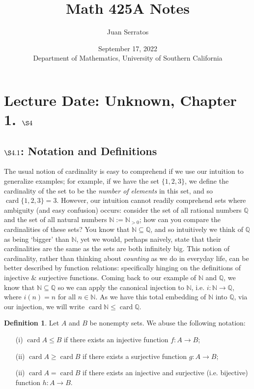 \documentclass[9pt,reqno]{amsart}
\title{Math 425A Notes}
\author{Juan Serratos}
\date{ September 17, 2022 \\ {Department of Mathematics, University of Southern California}}
\theoremstyle{definition}
\newtheorem{defi}{Definition}[section]
\newcommand{\nn}{\mathbb N}
\newcommand{\qq}{\mathbb Q}
\DeclareMathOperator{\card}{card}
\begin{document}
\maketitle
\setcounter{tocdepth}{4}
\setcounter{secnumdepth}{4}
\tableofcontents
\section{Lecture Date: Unknown, Chapter 1. $\S 4$} 
\subsection{$\S 4.1$: Notation and Definitions} The usual notion of cardinality is easy to comprehend if we use our intuition to generalize examples; for example, if we have the set $\{ 1, 2, 3 \}$, we define the cardinality of the set to be the \textit{number of elements} in this set, and so $\card\{1,2, 3 \} = 3$. However, our intuition cannot readily comprehend sets where ambiguity (and easy confusion) occurs: consider the set of all rational numbers $\qq$ and the set of all natural numbers $\nn := \nn_{>0}$; how can you compare the cardinalities of these sets? You know that $\nn \subseteq \qq$, and so intuitively we think of $\qq$ as being `bigger' than $\nn$, yet we would, perhaps naively, state that their cardinalities are the same as the sets are both infinitely big. This notion of cardinality, rather than thinking about \textit{counting} as we do in everyday life, can be better described by function relations: specifically hinging on the definitions of injective $\&$ surjective functions. Coming back to our example of $\nn$ and $\qq$, we know that $\nn \subseteq \qq$ so we can apply the canonical injection to $\nn$, i.e. $i \colon \nn \to \qq$, where $i(n) = n$ for all $n \in \nn$. As we have this total embedding of $\nn$ into $\qq$, via our injection, we will write $\card \nn \leq \card \qq$.
\begin{defi}
Let $A$ and $B$ be nonempty sets. We abuse the following notation:
\begin{itemize}
	\item[(i)] $\card A \leq B$ if there exists an injective function $f \colon A \to B$;
	\item[(ii)] $\card A \geq \card B$ if there exists a surjective function $g \colon A \to B$;
	\item[(ii)] $\card A = \card B$ if there exists an injective and surjective (i.e. bijective) function $h \colon A \to B$.
\end{itemize}	
\end{defi}
\end{document}
